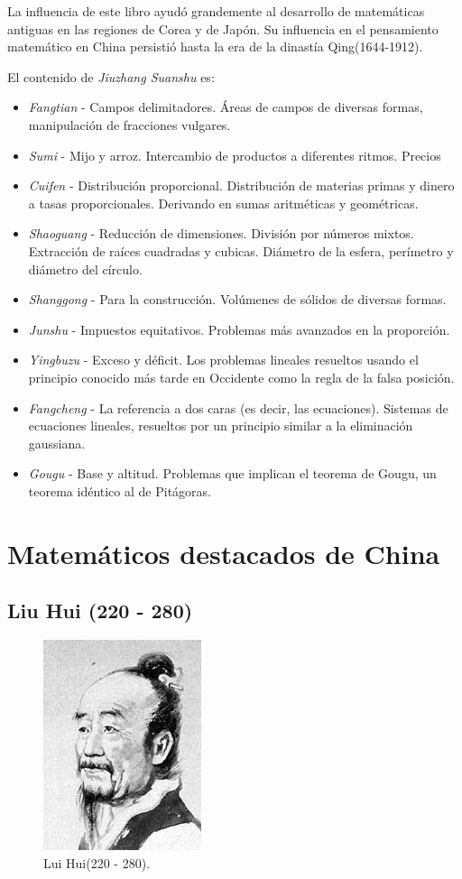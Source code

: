 \documentclass[a4paper, 11pt]{article}
\begin{document}
		La influencia de este libro ayudó grandemente al desarrollo de matemáticas antiguas en las regiones de Corea y de
		Japón. Su influencia en el pensamiento matemático en China persistió hasta la era de la dinastía Qing(1644-1912).
		
		El contenido de \textit{Jiuzhang Suanshu} es:
		\begin{itemize}
			\item \textit{Fangtian} - Campos delimitadores. Áreas de campos de diversas formas, manipulación de fracciones vulgares.
			\item \textit{Sumi} - Mijo y arroz. Intercambio de productos a diferentes ritmos. Precios
			\item \textit{Cuifen} - Distribución proporcional. Distribución de materias primas y dinero a tasas proporcionales. Derivando en sumas aritméticas y geométricas.
			\item \textit{Shaoguang} - Reducción de dimensiones. División por números mixtos. Extracción de raíces cuadradas y cubicas. Diámetro de la esfera, perímetro y diámetro del círculo.
			\item \textit{Shanggong} - Para la construcción. Volúmenes de sólidos de diversas formas.
			\item \textit{Junshu} - Impuestos equitativos. Problemas más avanzados en la proporción.
			\item \textit{Yingbuzu} - Exceso y déficit. Los problemas lineales resueltos usando el principio conocido más tarde en Occidente como la regla de la falsa posición.
			\item \textit{Fangcheng} - La referencia a dos caras (es decir, las ecuaciones). Sistemas de ecuaciones lineales, resueltos por un principio similar a la eliminación gaussiana.
			\item \textit{Gougu} - Base y altitud. Problemas que implican el teorema de Gougu, un teorema idéntico al de Pitágoras.
		\end{itemize}
		
\section{Matemáticos destacados de China}

	\subsection{Liu Hui (220 - 280)}
		\begin{figure}[!ht]
			\centering
			\includegraphics{liu_hui.jpg}
			\caption{Lui Hui(220 - 280).}
			\label{fig:lui_hui}
		\end{figure}
		
\end{document}
